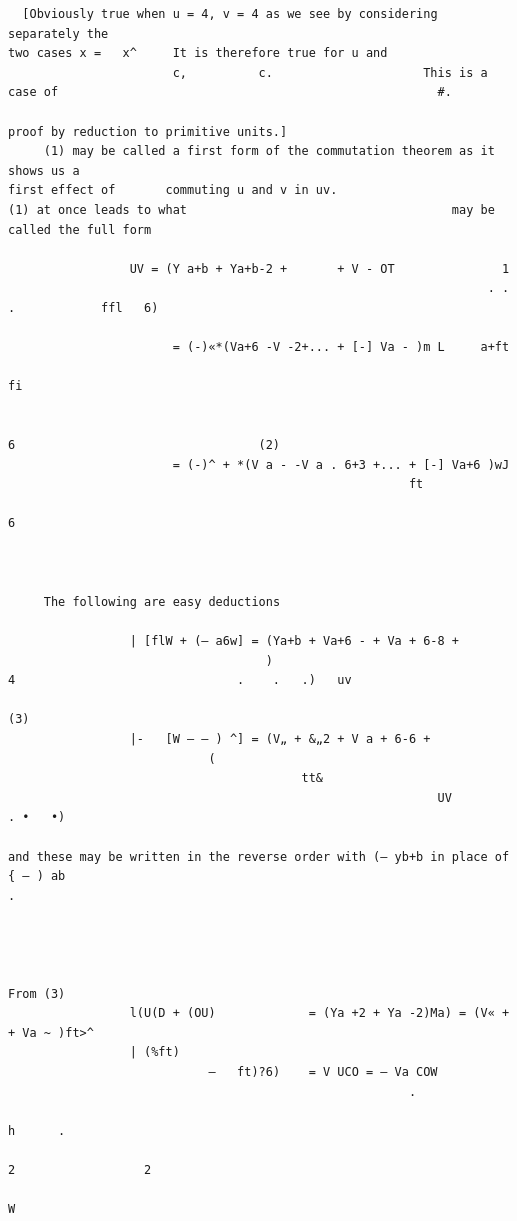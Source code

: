 \documentclass[10pt]{article}
\begin{document}
\begin{verbatim}
  [Obviously true when u = 4, v = 4 as we see by considering separately the
two cases x =   x^     It is therefore true for u and
                       c,          c.                     This is a case of                                                     #.

proof by reduction to primitive units.]
     (1) may be called a first form of the commutation theorem as it shows us a
first effect of       commuting u and v in uv.                                             (1) at once leads to what                                     may be
called the full form

                 UV = (Y a+b + Ya+b-2 +       + V - OT               1
                                                                   . . .            ffl   6)

                       = (-)«*(Va+6 -V -2+... + [-] Va - )m L     a+ft
                                                                                                           fi

                                                                                                                           6                                  (2)
                       = (-)^ + *(V a - -V a . 6+3 +... + [-] Va+6 )wJ
                                                        ft
                                                                                                                  6



     The following are easy deductions

                 | [flW + (— a6w] = (Ya+b + Va+6 - + Va + 6-8 +
                                    )                                                           4                               .    .   .)   uv
                                                                                                                                                              (3)
                 |-   [W — — ) ^] = (V„ + &„2 + V a + 6-6 +
                            (
                                         tt&
                                                            UV                                                  . •   •)

and these may be written in the reverse order with (— yb+b in place of { — ) ab                                                                                 .




From (3)
                 l(U(D + (OU)             = (Ya +2 + Ya -2)Ma) = (V« + + Va ~ )ft>^
                 | (%ft)
                            —   ft)?6)    = V UCO = — Va COW
                                                        .
                                                                                    h      .
                                                                                                                      2                  2
                                                                                                                                                              W


\end{verbatim}
\end{document}
